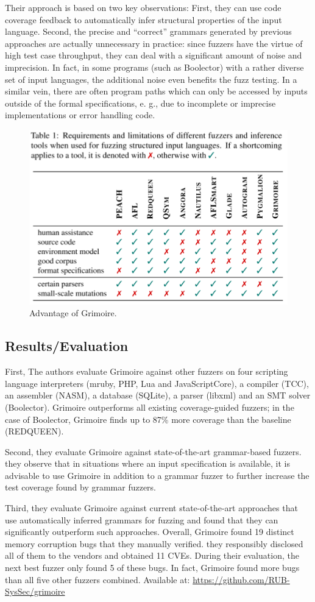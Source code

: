  Their approach is based on two key observations: First, they can use code coverage feedback to automatically infer structural properties of the input language. Second, the precise and “correct” grammars generated by previous approaches are actually unnecessary in practice: since fuzzers have the virtue of high test case throughput, they can deal with a significant amount of noise and imprecision. In fact, in some programs (such as Boolector) with a rather diverse set of input languages, the additional noise even benefits the fuzz testing. In a similar vein, there are often program paths which can only be accessed by inputs outside of the formal specifications, e. g., due to incomplete or imprecise implementations or error handling code.
\begin{figure}[h]
    \centering
    \includegraphics[width=0.7\linewidth]{grimoire.png} %
    \caption{Advantage of Grimoire.}	
    \label{fig:grimoire}
\end{figure}
\subsection{Results/Evaluation}
 First, The authors evaluate Grimoire against other fuzzers on four scripting language interpreters (mruby, PHP, Lua and JavaScriptCore), a compiler (TCC), an assembler (NASM), a database (SQLite), a parser (libxml) and an SMT solver (Boolector).  Grimoire outperforms all existing coverage-guided fuzzers; in the case of Boolector, Grimoire finds up to 87\% more coverage than the baseline (REDQUEEN). 

 Second, they evaluate Grimoire against state-of-the-art grammar-based fuzzers. they observe that in situations where an input specification is available, it is advisable to use Grimoire in addition to a grammar fuzzer to further increase the test coverage found by grammar fuzzers.
 
 Third, they evaluate Grimoire against current state-of-the-art approaches that use automatically inferred grammars for fuzzing and found that they can significantly outperform such approaches. Overall, Grimoire found 19 distinct memory corruption bugs that they manually verified. they responsibly disclosed all of them to the vendors and obtained 11 CVEs. During their evaluation, the next best fuzzer only found 5 of these bugs. In fact, Grimoire found more bugs than all five other fuzzers combined. Available at: \url{https://github.com/RUB-SysSec/grimoire}
